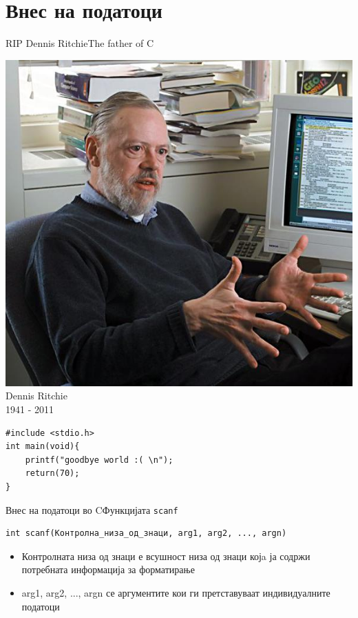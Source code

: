 
\section{Внес на податоци}
\begin{frame}[fragile]{RIP Dennis Ritchie}{The father of C}
\begin{center}
\includegraphics[scale=0.2]{images/dennis_ritchie}
\linebreak
Dennis Ritchie\\
1941 - 2011
\end{center}
\begin{lstlisting}
#include <stdio.h>
int main(void){
    printf("goodbye world :( \n");
    return(70);
}
\end{lstlisting}
\end{frame}

\begin{frame}[fragile]{Внес на податоци во C}{Функцијата \texttt{scanf}}
\begin{verbatim}
int scanf(Контролна_низа_од_знаци, arg1, arg2, ..., argn)   
\end{verbatim}  
    \begin{itemize}
    \item Контролната низа од знаци е всушност низа од знаци којa ја содржи потребната информација за форматирање   
    \item arg1, arg2, ..., argn се аргументите кои ги претставуваат индивидуалните податоци
    \end{itemize}    
\end{frame}

